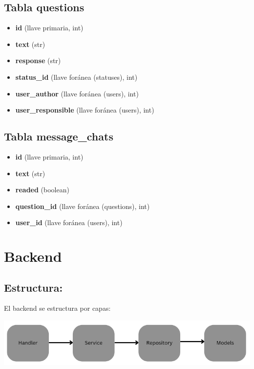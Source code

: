 \subsection{Tabla questions}

\begin{itemize}
	\item \textbf{id} (llave primaria, int)
	\item \textbf{text} (str)
	\item \textbf{response} (str)
	\item \textbf{status\_id} (llave foránea (statuses), int)
	\item \textbf{user\_author} (llave foránea (users), int)
    \item \textbf{user\_responsible} (llave foránea (users), int)
\end{itemize}

\subsection{Tabla message\_chats}

\begin{itemize}
	\item \textbf{id} (llave primaria, int)
	\item \textbf{text} (str)
	\item \textbf{readed} (boolean)
	\item \textbf{question\_id} (llave foránea (questions), int)
	\item \textbf{user\_id} (llave foránea (users), int)
\end{itemize}

\section{Backend}

\subsection{Estructura:}
El backend se estructura por capas:
\newline

\includegraphics[width=13.8cm, height=2.5cm]{structure_backend.png}

